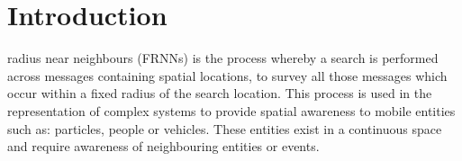 \section{Introduction}  
  
  
   radius near neighbours (FRNNs) is the process whereby a search is performed across messages containing spatial locations, to survey all those messages which occur within a fixed radius of the search location. This process is used in the representation of complex systems to provide spatial awareness to mobile entities such as: particles, people or vehicles. These entities exist in a continuous space and require awareness of neighbouring entities or events.
  
